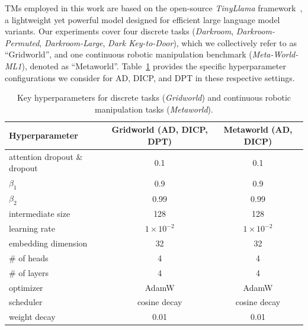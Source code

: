 \documentclass{article}
\begin{document}
TMs employed in this work are based on the open-source \emph{TinyLlama} framework~\citep{zhang2024tinyllama}, 
a lightweight yet powerful model designed for efficient large language model variants. 
Our experiments cover four discrete tasks (\textit{Darkroom}, \textit{Darkroom-Permuted}, \textit{Darkroom-Large}, \textit{Dark Key-to-Door}), which we collectively refer to as ``Gridworld'', and one continuous robotic manipulation benchmark (\textit{Meta-World-ML1}), denoted as ``Metaworld''. 
Table~\ref{tab:hyp-tf} provides the specific hyperparameter configurations we consider for AD, DICP, and DPT in these respective settings.
%
\begin{table}[h]
\caption{Key hyperparameters for discrete tasks (\textit{Gridworld}) and continuous robotic manipulation tasks (\textit{Metaworld}).}
\label{tab:hyp-tf}
\centering
\begin{tabular}{lcc}
\toprule
\textbf{Hyperparameter} & \textbf{Gridworld (AD, DICP, DPT)} & \textbf{Metaworld (AD, DICP)} \\
\midrule
attention dropout \& dropout   & 0.1           & 0.1 \\
$\beta_1$             & 0.9           & 0.9 \\
$\beta_2$             & 0.99          & 0.99\\
intermediate size    & 128           & 128 \\
learning rate         & $1\times10^{-2}$ & $1\times10^{-2}$ \\
embedding dimension          & 32            & 32  \\
\# of heads           & 4             & 4   \\
\# of layers          & 4             & 4   \\
optimizer             & AdamW         & AdamW \\
scheduler             & cosine decay  & cosine decay \\
weight decay         & 0.01          & 0.01 \\
\bottomrule
\end{tabular}
\end{table}
\end{document}

